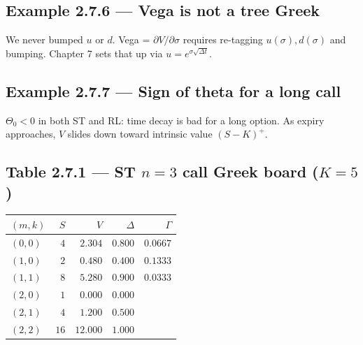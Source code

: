 \documentclass[
  10pt,
  twoside]{book}
\newcounter{none} %
\begin{document}
\subsection{Example 2.7.6 --- Vega is not a tree
Greek}\label{example-2.7.6-vega-is-not-a-tree-greek}

We never bumped \(u\) or \(d\). Vega = \(\partial V/\partial \sigma\)
requires re-tagging \(u(\sigma), d(\sigma)\) and bumping. Chapter 7 sets
that up via \(u=e^{\sigma\sqrt{\Delta t}}\).

\subsection{Example 2.7.7 --- Sign of theta for a long
call}\label{example-2.7.7-sign-of-theta-for-a-long-call}

\(\Theta_0<0\) in both ST and RL: time decay is bad for a long option.
As expiry approaches, \(V\) slides down toward intrinsic value
\((S-K)^+\).

\subsection{\texorpdfstring{Table 2.7.1 --- ST \(n=3\) call Greek board
(\(K=5\))}{Table 2.7.1 --- ST n=3 call Greek board (K=5)}}\label{table-2.7.1-st-n3-call-greek-board-k5}

{\def\LTcaptype{none} %
\begin{table}[H]
\centering
\begin{tabular}{|l|r|r|r|r|}
\toprule
\((m,k)\) & \(S\) & \(V\) & \(\Delta\) & \(\Gamma\) \\
\midrule



\((0,0)\) & \(\phantom{0}4\) & \(\phantom{0}2.304\) & \(0.800\) &
\(0.0667\) \\
\((1,0)\) & \(\phantom{0}2\) & \(\phantom{0}0.480\) & \(0.400\) &
\(0.1333\) \\
\((1,1)\) & \(\phantom{0}8\) & \(\phantom{0}5.280\) & \(0.900\) &
\(0.0333\) \\
\((2,0)\) & \(\phantom{0}1\) & \(\phantom{0}0.000\) & \(0.000\) & \\
\((2,1)\) & \(\phantom{0}4\) & \(\phantom{0}1.200\) & \(0.500\) & \\
\((2,2)\) & \(16\) & \(12.000\) & \(1.000\) & \\
\bottomrule
\end{tabular}
\end{table}
}
\end{document}
